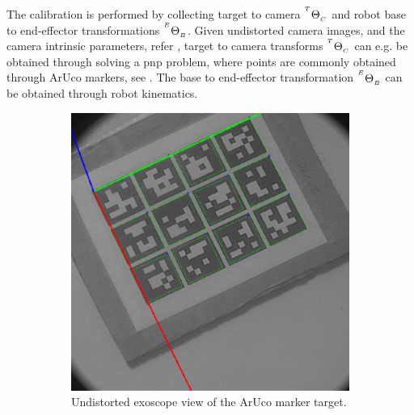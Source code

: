 The calibration is performed by collecting target to camera ${}^{^T}\Theta_{_C}$ and robot base to end-effector transformations ${}^{^E}\Theta_{_B}$. Given undistorted camera images, and the camera intrinsic parameters, refer , target to camera transforms ${}^{^T}\Theta_{_C}$ can e.g. be obtained through solving a \gls{pnp} problem, where points are commonly obtained through ArUco markers, see . The base to end-effector transformation ${}^{^E}\Theta_{_B}$ can be obtained through robot kinematics.
\begin{figure}[htb]
    \centering
    \begin{subfigure}[b]{0.49\textwidth}
        \centering
        \includegraphics[width=\textwidth]{introduction/img/aruco.png}
        \caption{Undistorted exoscope view of the ArUco marker target.}
    \end{subfigure}
    \begin{subfigure}[b]{0.49\textwidth}
        \centering

\end{subfigure}
\end{figure}
